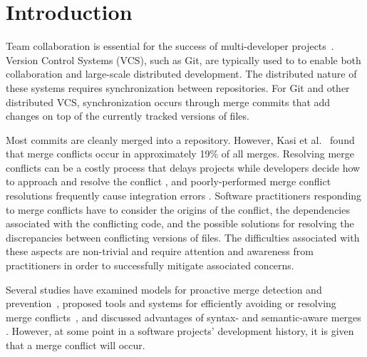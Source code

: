 \section{Introduction}\label{introduction}


Team collaboration is essential for the success of multi-developer projects~\cite{hattori2010syde}.
Version Control Systems (VCS), such as Git, are typically used to to enable both collaboration and large-scale distributed development.
The distributed nature of these systems requires synchronization between repositories.
For Git and other distributed VCS, synchronization occurs through merge commits that add changes on top of the currently tracked versions of files.

Most commits are cleanly merged into a repository.
However, Kasi et al.~\cite{cassandra} found that merge conflicts occur in approximately 19\% of all merges.
Resolving merge conflicts can be a costly process that delays projects while developers decide how to approach and resolve the conflict \cite{cassandra}, and poorly-performed merge conflict resolutions frequently cause integration errors \cite{bird-branches-conflict}.
Software practitioners responding to merge conflicts have to consider the origins of the conflict, the dependencies associated with the conflicting code, and the possible solutions for resolving the discrepancies between conflicting versions of files.
The difficulties associated with these aspects are non-trivial and require attention and awareness from practitioners in order to successfully mitigate associated concerns.

Several studies have examined models for proactive merge detection and prevention~\cite{Brun2011}\cite{palantir}\cite{Guimaraes}, proposed tools and systems for efficiently avoiding or resolving merge conflicts~\cite{nishimura}\cite{mens2002state}, and discussed advantages of syntax- and semantic-aware merges \cite{danny_refactorings}\cite{hunt2002extensible}. However, at some point in a software projects' development history, it is given that a merge conflict will occur. 

